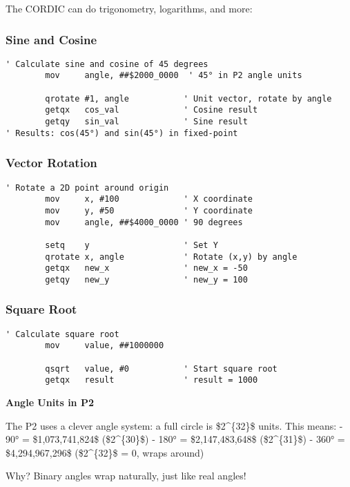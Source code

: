 \documentclass[11pt]{book}
\begin{document}
The CORDIC can do trigonometry, logarithms, and more:

\hypertarget{sine-and-cosine}{%
\subsubsection{Sine and Cosine}\label{sine-and-cosine}}

\begin{lstlisting}
' Calculate sine and cosine of 45 degrees
        mov     angle, ##$2000_0000  ' 45° in P2 angle units
        
        qrotate #1, angle           ' Unit vector, rotate by angle
        getqx   cos_val             ' Cosine result
        getqy   sin_val             ' Sine result
' Results: cos(45°) and sin(45°) in fixed-point
\end{lstlisting}

\hypertarget{vector-rotation}{%
\subsubsection{Vector Rotation}\label{vector-rotation}}

\begin{lstlisting}
' Rotate a 2D point around origin
        mov     x, #100             ' X coordinate
        mov     y, #50              ' Y coordinate
        mov     angle, ##$4000_0000 ' 90 degrees
        
        setq    y                   ' Set Y
        qrotate x, angle            ' Rotate (x,y) by angle
        getqx   new_x               ' new_x = -50
        getqy   new_y               ' new_y = 100
\end{lstlisting}

\hypertarget{square-root}{%
\subsubsection{Square Root}\label{square-root}}

\begin{lstlisting}
' Calculate square root
        mov     value, ##1000000
        
        qsqrt   value, #0           ' Start square root
        getqx   result              ' result = 1000
\end{lstlisting}

\begin{interlude}
\textbf{Angle Units in P2}

The P2 uses a clever angle system: a full circle is \$2\^{}\{32\}\$ units. This means:
- 90° = \$1,073,741,824\$ (\$2\^{}\{30\}\$)
- 180° = \$2,147,483,648\$ (\$2\^{}\{31\}\$)
- 360° = \$4,294,967,296\$ (\$2\^{}\{32\}\$ = 0, wraps around)

Why? Binary angles wrap naturally, just like real angles!
\end{interlude}
\end{document}
